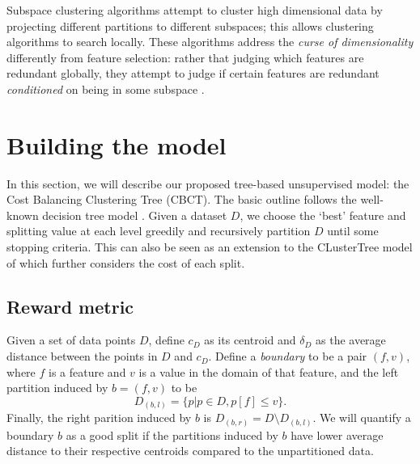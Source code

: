 \documentclass[conference]{IEEEtran}
\begin{document}
Subspace clustering algorithms attempt to cluster high dimensional data by 
projecting different partitions to different subspaces; this allows clustering
algorithms to search locally. These algorithms address the \emph{curse of
dimensionality} differently from feature selection: rather that judging which
features are redundant globally, they attempt to judge if certain features
are redundant \emph{conditioned} on being in some subspace \cite{b1}.

\section{Building the model}
In this section, we will describe our proposed tree-based unsupervised model:
the Cost Balancing Clustering Tree (CBCT). The basic outline follows the well-known
decision tree model \cite{b3}. Given a dataset $D$, we choose the
`best' feature and splitting value at each level greedily and recursively partition
$D$ until some stopping criteria. This can also be seen as an extension to the
CLusterTree model of \cite{b2} which further considers the cost of each split.

\subsection{Reward metric}
Given a set of data points $D$, define $c_D$ as its centroid and
$\delta_D$ as the average distance between the points in $D$ and $c_D$.
Define a \emph{boundary} to be a pair $(f,v)$, where $f$ is a feature and
$v$ is a value in the domain of that feature, and the left partition induced
by $b = (f,v)$ to be
$$ D_{(b,l)} = \{ p | p\in D, p[f] \le v \}. $$
Finally, the right parition induced by $b$ is $D_{(b,r)} = D \setminus D_{(b,l)}$.
We will quantify a boundary $b$ as a good split if the partitions induced by $b$
have lower average distance to their respective centroids compared to the
unpartitioned data.
\end{document}
